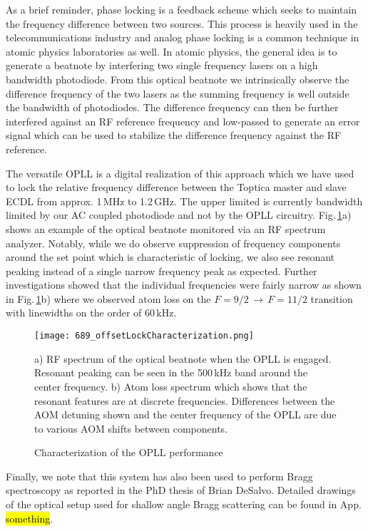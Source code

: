 As a brief reminder, phase locking is a feedback scheme which seeks to maintain the frequency difference between two sources.
This process is heavily used in the telecommunications industry and analog phase locking is a common technique in atomic physics laboratories as well.
In atomic physics, the general idea is to generate a beatnote by interfering two single frequency lasers on a high bandwidth photodiode.
From this optical beatnote we intrinsically observe the difference frequency of the two lasers as the summing frequency is well outside the bandwidth of photodiodes.
The difference frequency can then be further interfered against an RF reference frequency and low-passed to generate an error signal which can be used to stabilize the difference frequency against the RF reference.

The versatile OPLL is a digital realization of this approach which we have used to lock the relative frequency difference between the Toptica master and slave ECDL from approx. 1\,MHz to 1.2\,GHz.
The upper limited is currently bandwidth limited by our AC coupled photodiode and not by the OPLL circuitry.
Fig.\,\ref{fig:offsetDetails}a) shows an example of the optical beatnote monitored via an RF spectrum analyzer.
Notably, while we do observe suppression of frequency components around the set point which is characteristic of locking, we also see resonant peaking instead of a single narrow frequency peak as expected.
Further investigations showed that the individual frequencies were fairly narrow as shown in Fig.\,\ref{fig:offsetDetails}b) where we observed atom loss on the $F=9/2\,\rightarrow\,F=11/2$ transition with linewidths on the order of 60\,kHz.
	\begin{figure}
	\centerline{
		\texttt{[image: 689\_offsetLockCharacterization.png]}}
		\caption{Characterization of the OPLL performance}{a) RF spectrum of the optical beatnote when the OPLL is engaged. Resonant peaking can be seen in the 500\,kHz band around the center frequency. b) Atom loss spectrum which shows that the resonant features are at discrete frequencies. Differences between the AOM detuning shown and the center frequency of the OPLL are due to various AOM shifts between components.}
		 \label{fig:offsetDetails}
	\end{figure}

Finally, we note that this system has also been used to perform Bragg spectroscopy as reported in the PhD thesis of Brian DeSalvo.
Detailed drawings of the optical setup used for shallow angle Bragg scattering can be found in App. \hl{something}.


